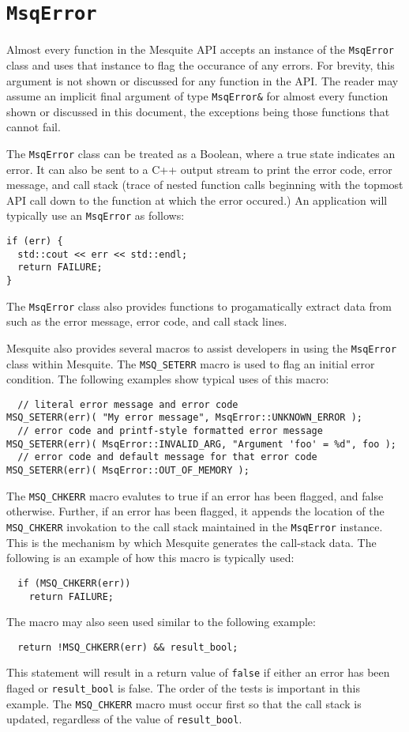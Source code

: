 \section{\texttt{MsqError}}
\label{sec:MsqError}

Almost every function in the Mesquite API accepts an instance of the \texttt{MsqError} class and uses that instance to flag the occurance of any errors.  For brevity, this argument is not shown or discussed for any function in the API.  The reader may assume an implicit final argument of type \texttt{MsqError\&} for almost every function shown or discussed in this document, the exceptions being those functions that cannot fail.

The \texttt{MsqError} class can be treated as a Boolean, where a true state indicates an error.  It can also be sent to a C++ output stream to print the error code, error message, and call stack (trace of nested function calls beginning with the topmost API call down to the function at which the error occured.)  An application will typically use an \texttt{MsqError} as follows:
\begin{lstlisting}
if (err) {
  std::cout << err << std::endl;
  return FAILURE;
}
\end{lstlisting}
The \texttt{MsqError} class also provides functions to progamatically extract data from such as the error message, error code, and call stack lines.

Mesquite also provides several macros to assist developers in using the \texttt{MsqError} class within Mesquite.  The \texttt{MSQ\_SETERR} macro is used to flag an initial error condition.  The following examples show typical uses of this macro:
\begin{lstlisting}
  // literal error message and error code
MSQ_SETERR(err)( "My error message", MsqError::UNKNOWN_ERROR );
  // error code and printf-style formatted error message
MSQ_SETERR(err)( MsqError::INVALID_ARG, "Argument 'foo' = %d", foo );
  // error code and default message for that error code
MSQ_SETERR(err)( MsqError::OUT_OF_MEMORY );
\end{lstlisting}

The \texttt{MSQ\_CHKERR} macro evalutes to true if an error has been flagged, and false otherwise.  Further, if an error has been flagged, it appends the location of the \texttt{MSQ\_CHKERR} invokation to the call stack maintained in the \texttt{MsqError} instance.  This is the mechanism by which Mesquite generates the call-stack data.  The following is an example of how this macro is typically used:
\begin{lstlisting}
  if (MSQ_CHKERR(err))
    return FAILURE;
\end{lstlisting}
The macro may also seen used similar to the following example:
\begin{lstlisting}
  return !MSQ_CHKERR(err) && result_bool;
\end{lstlisting}
This statement will result in a return value of \texttt{false} if either an error has been flaged or \texttt{result\_bool} is false.  The order of the tests is important in this example.  The \texttt{MSQ\_CHKERR} macro must occur first so that the call stack is updated, regardless of the value of \texttt{result\_bool}.

